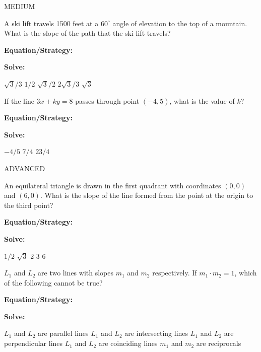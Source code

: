 \vfill
\newpage
\begin{multicols*}{2}
\begin{outline}[enumerate]
\centerline{\large MEDIUM}

\1 A ski lift travels 1500 feet at a $60^\circ$ angle of elevation to the top of a mountain. What is the slope of the path that the ski lift travels?

\bigskip
\textbf{Equation/Strategy:} \hrulefill

\bigskip
\textbf{Solve:}

\vfill
\2 $\sqrt3/3$
\2 $1/2$
\2 $\sqrt3/2$
\2 $2\sqrt3/3$
\2 $\sqrt3$

\midline

\1 If the line $3x+ky=8$ passes through point $(-4,5)$, what is the value of $k$?

\bigskip
\textbf{Equation/Strategy:} \hrulefill

\bigskip
\textbf{Solve:}

\vfill
\2 $-4/5$
\2 $7/4$
\2 $23/4$

\columnbreak
\centerline{\large ADVANCED}

\1 An equilateral triangle is drawn in the first quadrant with coordinates $(0,0)$ and $(6,0)$. What is the slope of the line formed from the point at the origin to the third point?

\bigskip
\textbf{Equation/Strategy:} \hrulefill

\bigskip
\textbf{Solve:}

\vfill
\2 $1/2$
\2 $\sqrt3$
\2 $2$
\2 $3$
\2 $6$

\midline

\1 $L_1$ and $L_2$ are two lines with slopes  $m_1$ and $m_2$ respectively. If $m_1\cdot m_2=1$, which of the following cannot be true?

\bigskip
\textbf{Equation/Strategy:}

\bigskip
\textbf{Solve:}

\vfill
\2 $L_1$ and $L_2$ are parallel lines
\2 $L_1$ and $L_2$ are intersecting lines
\2 $L_1$ and $L_2$ are perpendicular lines
\2 $L_1$ and $L_2$ are coinciding lines
\2 $m_1$ and $m_2$ are reciprocals
\end{outline}
\end{multicols*}